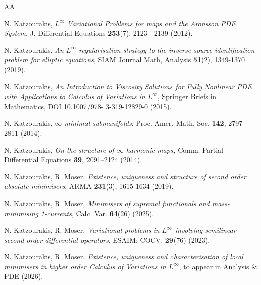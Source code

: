 \documentclass[a4paper,11pt]{article}
\numberwithin{equation}{section}
\theoremstyle{definition}
\begin{document}
\begin{thebibliography}{AA}

N. Katzourakis, {\it $L^\infty$ Variational Problems for maps and the Aronsson PDE System}, J. Differential
Equations {\bf 253}(7), 2123 - 2139 (2012).

N. Katzourakis, {\it An $L^\infty$ regularisation strategy to the inverse source identification problem for elliptic equations}, SIAM Journal Math, Analysis {\bf 51}(2), 1349-1370 (2019).


N. Katzourakis, {\it An Introduction to Viscosity Solutions for Fully Nonlinear PDE with Applications
to Calculus of Variations in $L^\infty$}, Springer Briefs in Mathematics,  DOI 10.1007/978-
3-319-12829-0 (2015).

N. Katzourakis, {\it $\infty$-minimal submanifolds}, Proc. Amer. Math. Soc. {\bf 142}, 2797-2811 (2014).

N. Katzourakis, {\it On the structure of $\infty$-harmonic maps}, Comm. Partial Differential
Equations {\bf 39}, 2091–2124 (2014).



N. Katzourakis, R. Moser, {\it Existence, uniqueness and structure of second order absolute minimisers}, ARMA {\bf 231}(3), 1615-1634 (2019).

N. Katzourakis, R. Moser, {\it Minimisers of supremal functionals and mass-minimising 1-currents}, Calc. Var.{ \bf 64}(26) (2025).

N. Katzourakis, R. Moser, {\it Variational problems in $L^\infty$ involving semilinear second order differential operators}, ESAIM: COCV, {\bf 29}(76) (2023).

N. Katzourakis, R. Moser. {\it Existence, uniqueness and characterisation of local minimisers in higher order Calculus of Variations in $L^\infty$}, to appear in Analysis \& PDE (2026).


\end{thebibliography}
\end{document}
